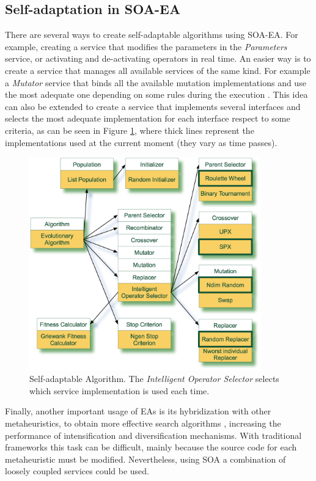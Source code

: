 \subsection{Self-adaptation in SOA-EA}
\label{sec:otherexamples}
There are several ways to create self-adaptable algorithms using SOA-EA. For example, creating a service that modifies the parameters in the {\em Parameters} service, or activating and de-activating operators in real time. An easier way is to create a service that manages all available services of the same kind. For example a {\em Mutator} service that binds all the available mutation implementations and use the most adequate one depending on some rules during the execution \cite{SelfadaptationSerpell2010}.  This idea can also be extended to create a service that implements several interfaces and selects the most adequate implementation for each interface respect to some criteria, as can be seen in Figure \ref{INTELLIGENTALGORITHM}, where thick lines represent the implementations used at the current moment (they vary as time passes).



\begin{figure}
\centering
\includegraphics[width=10cm]{gfx/soaea/intelligent.jpg}
\caption{Self-adaptable Algorithm. The {\em Intelligent Operator Selector} selects which service implementation is used each time.}
\label{INTELLIGENTALGORITHM}
\end{figure}


Finally, another important usage of EAs is its hybridization with other metaheuristics, to obtain more effective search algorithms \cite{HybridRodriguez2012},  increasing the performance of intensification and diversification mechanisms. With  traditional frameworks this task can be difficult, mainly because the source code for each metaheuristic must be modified. Nevertheless, using SOA a combination of loosely coupled services could be used.


